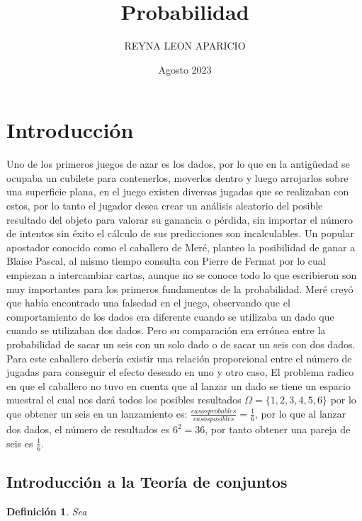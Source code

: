 \documentclass[12pt]{article}
\title{Probabilidad}
\author{REYNA LEON  APARICIO}
\date{Agosto 2023}
\newtheorem{Def}{\quad Definición}
\begin{document}
\maketitle

\section{Introducción}

Uno de los primeros juegos de azar es los dados, por lo que en la antigüedad se ocupaba un cubilete para contenerlos, moverlos dentro y luego arrojarlos sobre una superficie plana, en el juego existen diversas jugadas que se realizaban con estos, por lo tanto el jugador desea crear un análisis aleatorio del posible resultado  del objeto para valorar su ganancia o pérdida, sin importar el número de intentos sin éxito el cálculo de sus predicciones son incalculables. Un popular apostador conocido como el caballero de Meré, planteo la posibilidad de ganar a Blaise Pascal, al mismo tiempo consulta con Pierre de Fermat por lo cual empiezan a intercambiar cartas, aunque no se conoce todo lo que escribieron son muy importantes para los primeros fundamentos de la probabilidad. Meré creyó que había encontrado una falsedad en el juego, observando que el comportamiento de los dados era diferente cuando se utilizaba un dado que cuando se utilizaban dos dados. Pero su comparación era errónea entre la probabilidad de sacar un seis con un solo dado o de sacar un seis con dos dados. Para este caballero debería existir una relación proporcional entre el número de jugadas para conseguir el efecto deseado en uno y otro caso, El problema radico en que el caballero no tuvo en cuenta que al lanzar un dado se tiene un espacio muestral el cual nos dará todos los posibles  resultados $ \Omega = \{ 1, 2, 3, 4, 5,6 \}$ por lo que obtener un seis en un lanzamiento es: $ \frac{casos probables}{casos posibles} = \frac{1}{6} $, por lo que al lanzar dos dados, el número de resultados es $6^2 = 36$, por tanto obtener una pareja de seis es $\frac{1}{6}$.


\subsection{Introducción a la Teoría de conjuntos}

\begin{Def}
Sea
\end{Def}
\end{document}
